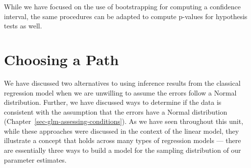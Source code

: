 \documentclass[
  letterpaper,
  DIV=11,
  numbers=noendperiod]{scrreprt}
\theoremstyle{definition}
\theoremstyle{definition}
\theoremstyle{remark}
\begin{document}
\begin{tcolorbox}[enhanced jigsaw, left=2mm, toprule=.15mm, arc=.35mm, breakable, opacitybacktitle=0.6, opacityback=0, rightrule=.15mm, colbacktitle=quarto-callout-note-color!10!white, coltitle=black, leftrule=.75mm, toptitle=1mm, colframe=quarto-callout-note-color-frame, titlerule=0mm, title=\textcolor{quarto-callout-note-color}{\faInfo}\hspace{0.5em}{Note}, bottomrule=.15mm, colback=white, bottomtitle=1mm]

While we have focused on the use of bootstrapping for computing a
confidence interval, the same procedures can be adapted to compute
p-values for hypothesis tests as well.

\end{tcolorbox}

\hypertarget{choosing-a-path}{%
\section{Choosing a Path}\label{choosing-a-path}}

We have discussed two alternatives to using inference results from the
classical regression model when we are unwilling to assume the errors
follow a Normal distribution. Further, we have discussed ways to
determine if the data is consistent with the assumption that the errors
have a Normal distribution (Chapter~\ref{sec-glm-assessing-conditions}).
As we have seen throughout this unit, while these approaches were
discussed in the context of the linear model, they illustrate a concept
that holds across many types of regression models --- there are
essentially three ways to build a model for the sampling distribution of
our parameter estimates.
\end{document}
